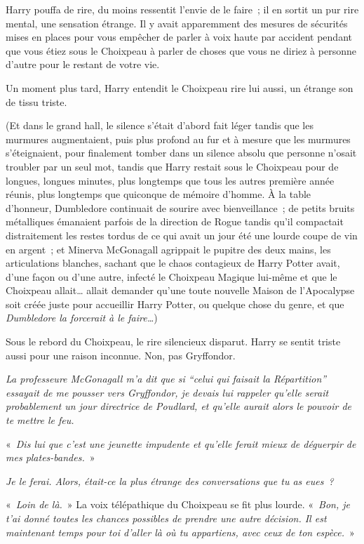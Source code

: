 Harry pouffa de rire, du moins ressentit l'envie de le faire~;
il en sortit un pur rire mental, une sensation étrange.
Il y avait apparemment des mesures de sécurités mises en places pour vous empêcher de parler à voix haute par accident pendant que vous étiez sous le Choixpeau à parler de choses que vous ne diriez à personne d'autre pour le restant de votre vie.

Un moment plus tard, Harry entendit le Choixpeau rire lui aussi, un étrange son de tissu triste.

(Et dans le grand hall, le silence s'était d'abord fait léger tandis que les murmures augmentaient, puis plus profond au fur et à mesure que les murmures s'éteignaient, pour finalement tomber dans un silence absolu que personne n'osait troubler par un seul mot, tandis que Harry restait sous le Choixpeau pour de longues, longues minutes, plus longtemps que tous les autres première année réunis, plus longtemps que quiconque de mémoire d'homme.
À la table d'honneur, Dumbledore continuait de sourire avec bienveillance~; de petits bruits métalliques émanaient parfois de la direction de Rogue tandis qu'il compactait distraitement les restes tordus de ce qui avait un jour été une lourde coupe de vin en argent~;
et Minerva McGonagall agrippait le pupitre des deux mains, les articulations blanches, sachant que le chaos contagieux de Harry Potter avait, d'une façon ou d'une autre, infecté le Choixpeau Magique lui-même et que le Choixpeau allait… allait demander qu'une toute nouvelle Maison de l'Apocalypse soit créée juste pour accueillir Harry Potter, ou quelque chose du genre, et que \emph{Dumbledore la forcerait à le faire…})

Sous le rebord du Choixpeau, le rire silencieux disparut.
Harry se sentit triste aussi pour une raison inconnue.
Non, pas Gryffondor.

\emph{La professeure McGonagall m'a dit que si “celui qui faisait la Répartition” essayait de me pousser vers Gryffondor, je devais lui rappeler qu'elle serait probablement un jour directrice de Poudlard, et qu'elle aurait alors le pouvoir de te mettre le feu.}

«~\emph{Dis lui que c'est une jeunette impudente et qu'elle ferait mieux de déguerpir de mes plates-bandes.}~»

\emph{Je le ferai. Alors, était-ce la plus étrange des conversations que tu as eues~?}

«~\emph{Loin de là.}~» La voix télépathique du Choixpeau se fit plus lourde.
«~\emph{Bon, je t'ai donné toutes les chances possibles de prendre une autre décision.
Il est maintenant temps pour toi d'aller là où tu appartiens, avec ceux de ton espèce.}~»

